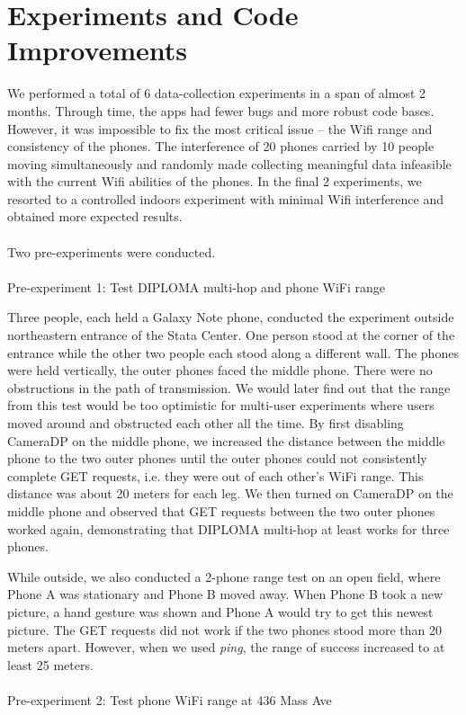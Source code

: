 \chapter{Experiments and Code Improvements}

We performed a total of 6 data-collection experiments in a span of almost 2 months. Through time, the apps had fewer bugs and more robust code bases. However, it was impossible to fix the most critical issue -- the Wifi range and consistency of the phones. The interference of 20 phones carried by 10 people moving simultaneously and randomly made collecting meaningful data infeasible with the current Wifi abilities of the phones. In the final 2 experiments, we resorted to a controlled indoors experiment with minimal Wifi interference and obtained more expected results.
\\
\\
Two pre-experiments were conducted.
\\
\\
Pre-experiment 1: Test DIPLOMA multi-hop and phone WiFi range

Three people, each held a Galaxy Note phone, conducted the experiment outside northeastern entrance of the Stata Center. One person stood at the corner of the entrance while the other two people each stood along a different wall. The phones were held vertically, the outer phones faced the middle phone. There were no obstructions in the path of transmission. We would later find out that the range from this test would be too optimistic for multi-user experiments where users moved around and obstructed each other all the time. By first disabling CameraDP on the middle phone, we increased the distance between the middle phone to the two outer phones until the outer phones could not consistently complete GET requests, i.e. they were out of each other's WiFi range. This distance was about 20 meters for each leg. We then turned on CameraDP on the middle phone and observed that GET requests between the two outer phones worked again, demonstrating that DIPLOMA multi-hop at least works for three phones. 

While outside, we also conducted a 2-phone range test on an open field, where Phone A was stationary and Phone B moved away. When Phone B took a new picture, a hand gesture was shown and Phone A would try to get this newest picture. The GET requests did not work if the two phones stood more than 20 meters apart. However, when we used {\it ping}, the range of success increased to at least 25 meters.
\\
\\
Pre-experiment 2: Test phone WiFi range at 436 Mass Ave


